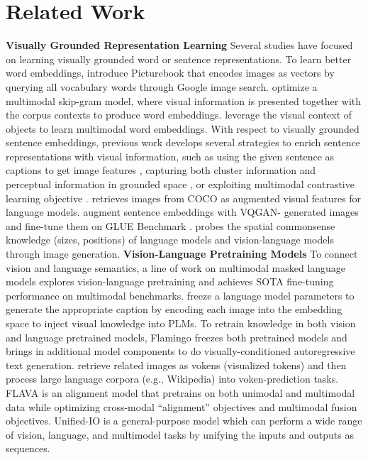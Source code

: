 \documentclass[11pt]{article}
\begin{document}
\section{Related Work}
\textbf{Visually Grounded Representation Learning} Several studies have focused on learning visually grounded word or sentence representations. To learn better word embeddings, \citet{kiros-etal-2018-illustrative} introduce Picturebook that encodes images as vectors by querying all vocabulary words through Google image search. 
\citet{lazaridou2015combining} optimize a multimodal skip-gram model, where visual information is presented together with the corpus contexts to produce word embeddings.
\citet{zablocki2018learning} leverage the visual context of objects to learn multimodal word embeddings. 
With respect to visually grounded sentence embeddings, previous work develops several strategies to enrich sentence representations with visual information, such as using the given sentence as captions to get image features \citep{kiela-etal-2018-learning}, capturing both cluster information and perceptual information in grounded space \citep{bordes-etal-2019-incorporating}, or exploiting multimodal contrastive learning objective \cite{zhang2022mcse}.
\citet{zhang2021semi} retrieves images from COCO \cite{lin2014microsoft} as augmented visual features for language models.
\citet{lu2022imagination} augment sentence embeddings with VQGAN-\citep{esser2021taming} generated images and fine-tune them on GLUE Benchmark \citep{wang2018glue}. \citet{liu-etal-2022-things} probes the spatial commonsense knowledge (sizes, positions) of language models and vision-language models through image generation.
\medbreak
\noindent \textbf{Vision-Language Pretraining Models} 
To connect vision and language semantics, a line of work on multimodal masked language models \cite{li2019visualbert, tan2019lxmert, NEURIPS2019_c74d97b0, Su2020VL-BERT} explores vision-language pretraining and achieves SOTA fine-tuning performance on multimodal benchmarks. \citet{tsimpoukelli2021multimodal} freeze a language model parameters to generate the appropriate caption by encoding each image into the embedding space to inject visual knowledge into PLMs. To retrain knowledge in both vision and language pretrained models, Flamingo \citep{alayrac2022flamingo} freezes both pretrained models and brings in additional model components to do visually-conditioned autoregressive text generation. \citet{tan-bansal-2020-vokenization} retrieve related images as vokens (visualized tokens) and then process large language corpora (e.g., Wikipedia) into voken-prediction tasks. FLAVA \citep{singh2022flava} is an alignment model that pretrains on both unimodal and multimodal data while optimizing cross-modal ``alignment'' objectives and multimodal fusion objectives. Unified-IO \cite{lu2022unified} is a general-purpose model which can perform a wide range of vision, language, and multimodel tasks by unifying the inputs and outputs as sequences.
\end{document}
